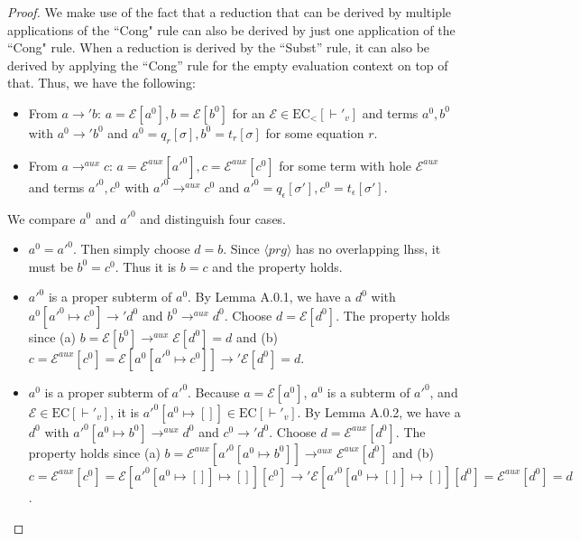 \cdpaux*
\begin{proof}
We make use of the fact that a reduction that can be derived by multiple applications of the ``Cong" rule can also be derived by just one application of the ``Cong" rule. When a reduction is derived by the ``Subst'' rule, it can also be derived by applying the ``Cong'' rule for the empty evaluation context on top of that. Thus, we have the following:
\begin{itemize}
\item From $a \longrightarrow' b$: $a = \mathcal{E}[a^0], b = \mathcal{E}[b^0]$ for an $\mathcal{E} \in \textrm{EC}_<[\vdash'_v]$ and terms $a^0, b^0$ with $a^0 \longrightarrow' b^0$ and $a^0 = q_r[\sigma], b^0 = t_r[\sigma]$ for some equation $r$.

\item From $a \longrightarrow^{aux} c$: $a = \mathcal{E}^{aux}[a'^0], c = \mathcal{E}^{aux}[c^0]$ for some term with hole $\mathcal{E}^{aux}$ and terms $a'^0, c^0$ with $a'^0 \longrightarrow^{aux} c^0$ and $a'^0 = q_\epsilon[\sigma'], c^0 = t_\epsilon[\sigma']$.
\end{itemize}

We compare $a^0$ and $a'^0$ and distinguish four cases.
\begin{itemize}
\item $a^0 = a'^0$. Then simply choose $d = b$. Since $\langle prg \rangle$ has no overlapping lhss, it must be $b^0 = c^0$. Thus it is $b = c$ and the property holds.

\item $a'^0$ is a proper subterm of $a^0$. By Lemma A.0.1, we have a $d^0$ with $a^0[a'^0 \mapsto c^0] \longrightarrow' d^0$ and $b^0 \longrightarrow^{aux} d^0$. Choose $d = \mathcal{E}[d^0]$. The property holds since (a) $b = \mathcal{E}[b^0] \longrightarrow^{aux} \mathcal{E}[d^0] = d$ and (b) $c = \mathcal{E}^{aux}[c^0] = \mathcal{E}[a^0[a'^0 \mapsto c^0]] \longrightarrow' \mathcal{E}[d^0] = d$.

\item $a^0$ is a proper subterm of $a'^0$. Because $a = \mathcal{E}[a^0]$, $a^0$ is a subterm of $a'^0$, and $\mathcal{E} \in \textrm{EC}[\vdash'_v]$, it is $a'^0[a^0 \mapsto []] \in \textrm{EC}[\vdash'_v]$. By Lemma A.0.2, we have a $d^0$ with $a'^0[a^0 \mapsto b^0] \longrightarrow^{aux} d^0$ and $c^0 \longrightarrow' d^0$. Choose $d = \mathcal{E}^{aux}[d^0]$. The property holds since (a) $b = \mathcal{E}^{aux}[a'^0[a^0 \mapsto b^0]] \longrightarrow^{aux} \mathcal{E}^{aux}[d^0]$ and (b) $c = \mathcal{E}^{aux}[c^0] = \mathcal{E}[a'^0[a^0 \mapsto []] \mapsto []][c^0] \longrightarrow' \mathcal{E}[a'^0[a^0 \mapsto []] \mapsto []][d^0] = \mathcal{E}^{aux}[d^0] = d$.


\end{itemize}
\end{proof}
